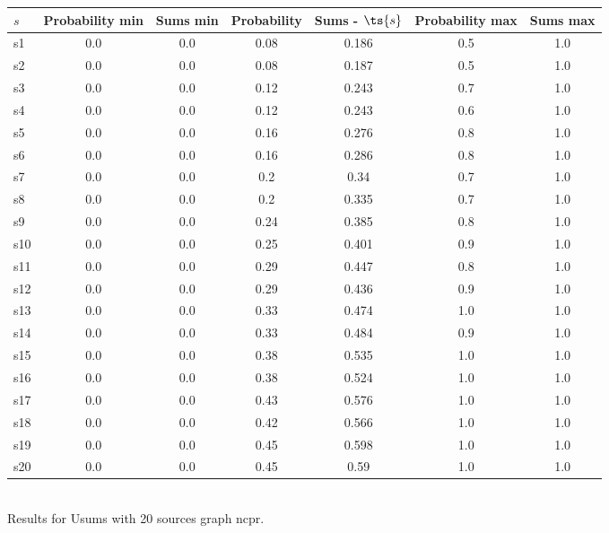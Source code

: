 \documentclass{article}
\begin{document}
\noindent\begin{tabular}{|l|c|c|c|c|c|c|}
\hline
$s$& Probability min & Sums min & Probability & Sums - $\ts{s}$ & Probability max & Sums max\\
\hline
s1 &0.0 & 0.0 & 0.08 & 0.186 & 0.5 & 1.0\\
\hline
s2 &0.0 & 0.0 & 0.08 & 0.187 & 0.5 & 1.0\\
\hline
s3 &0.0 & 0.0 & 0.12 & 0.243 & 0.7 & 1.0\\
\hline
s4 &0.0 & 0.0 & 0.12 & 0.243 & 0.6 & 1.0\\
\hline
s5 &0.0 & 0.0 & 0.16 & 0.276 & 0.8 & 1.0\\
\hline
s6 &0.0 & 0.0 & 0.16 & 0.286 & 0.8 & 1.0\\
\hline
s7 &0.0 & 0.0 & 0.2 & 0.34 & 0.7 & 1.0\\
\hline
s8 &0.0 & 0.0 & 0.2 & 0.335 & 0.7 & 1.0\\
\hline
s9 &0.0 & 0.0 & 0.24 & 0.385 & 0.8 & 1.0\\
\hline
s10 &0.0 & 0.0 & 0.25 & 0.401 & 0.9 & 1.0\\
\hline
s11 &0.0 & 0.0 & 0.29 & 0.447 & 0.8 & 1.0\\
\hline
s12 &0.0 & 0.0 & 0.29 & 0.436 & 0.9 & 1.0\\
\hline
s13 &0.0 & 0.0 & 0.33 & 0.474 & 1.0 & 1.0\\
\hline
s14 &0.0 & 0.0 & 0.33 & 0.484 & 0.9 & 1.0\\
\hline
s15 &0.0 & 0.0 & 0.38 & 0.535 & 1.0 & 1.0\\
\hline
s16 &0.0 & 0.0 & 0.38 & 0.524 & 1.0 & 1.0\\
\hline
s17 &0.0 & 0.0 & 0.43 & 0.576 & 1.0 & 1.0\\
\hline
s18 &0.0 & 0.0 & 0.42 & 0.566 & 1.0 & 1.0\\
\hline
s19 &0.0 & 0.0 & 0.45 & 0.598 & 1.0 & 1.0\\
\hline
s20 &0.0 & 0.0 & 0.45 & 0.59 & 1.0 & 1.0\\
\hline
\end{tabular}\\

\noindent Results for Usums with 20 sources graph ncpr.
\end{document}

